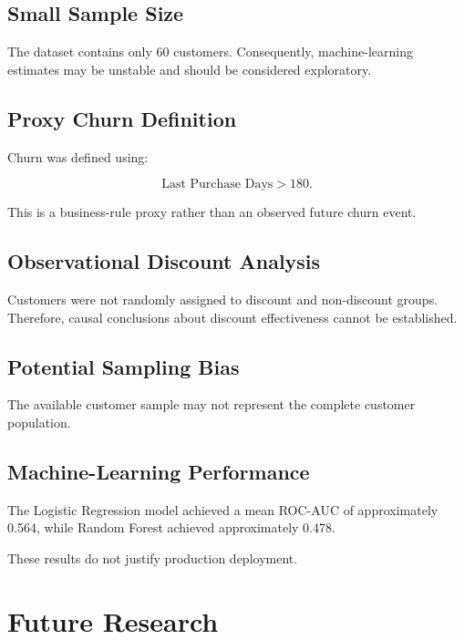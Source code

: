 \documentclass[11pt,a4paper]{article}
\begin{document}
\subsection{Small Sample Size}

The dataset contains only 60 customers. Consequently, machine-learning estimates may be unstable and should be considered exploratory.

\subsection{Proxy Churn Definition}

Churn was defined using:

\[
\text{Last Purchase Days}>180.
\]

This is a business-rule proxy rather than an observed future churn event.

\subsection{Observational Discount Analysis}

Customers were not randomly assigned to discount and non-discount groups. Therefore, causal conclusions about discount effectiveness cannot be established.

\subsection{Potential Sampling Bias}

The available customer sample may not represent the complete customer population.

\subsection{Machine-Learning Performance}

The Logistic Regression model achieved a mean ROC-AUC of approximately 0.564, while Random Forest achieved approximately 0.478.

These results do not justify production deployment.


\section{Future Research}
\end{document}
